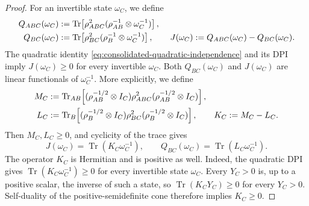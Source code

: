 \documentclass[11pt]{article}
\theoremstyle{remark}
\newcommand{\1}{\mathbbm{1}}
\begin{document}
\begin{proof}
For an invertible state $\omega_C$, we define
\begin{align}
 Q_{ABC}(\omega_C)
 &:=\operatorname{Tr}\!\left[
  \rho_{ABC}^2(\rho_{AB}^{-1}\otimes\omega_C^{-1})
 \right],\notag\\
 Q_{BC}(\omega_C)
 &:=\operatorname{Tr}\!\left[
  \rho_{BC}^2(\rho_B^{-1}\otimes\omega_C^{-1})
 \right],\qquad
 J(\omega_C):=Q_{ABC}(\omega_C)-Q_{BC}(\omega_C).
 \label{eq:consolidated-quadratic-reference-functionals}
\end{align}
The quadratic identity
\eqref{eq:consolidated-quadratic-independence} and its DPI imply
$J(\omega_C)\geq0$ for every invertible $\omega_C$.  Both
$Q_{BC}(\omega_C)$ and $J(\omega_C)$ are linear functionals of
$\omega_C^{-1}$.  More explicitly, we define
\begin{align}
 M_C&:=\operatorname{Tr}_{AB}\!\left[
  (\rho_{AB}^{-1/2}\otimes I_C)\rho_{ABC}^2
  (\rho_{AB}^{-1/2}\otimes I_C)\right],\notag\\
 L_C&:=\operatorname{Tr}_B\!\left[
  (\rho_B^{-1/2}\otimes I_C)\rho_{BC}^2
  (\rho_B^{-1/2}\otimes I_C)\right],
 \qquad K_C:=M_C-L_C.
\end{align}
Then $M_C,L_C\geq0$, and cyclicity of the trace gives
\begin{equation}
 J(\omega_C)=\operatorname{Tr}(K_C\omega_C^{-1}),\qquad
 Q_{BC}(\omega_C)=\operatorname{Tr}(L_C\omega_C^{-1}).
\end{equation}
The operator $K_C$ is Hermitian and is positive as well.  Indeed,
the quadratic DPI gives $\operatorname{Tr}(K_C\omega_C^{-1})\geq0$ for every
invertible state $\omega_C$.  Every $Y_C>0$ is, up to a positive
scalar, the inverse of such a state, so
$\operatorname{Tr}(K_CY_C)\geq0$ for every $Y_C>0$.  Self-duality of the
positive-semidefinite cone therefore implies $K_C\geq0$.


\end{proof}
\end{document}
